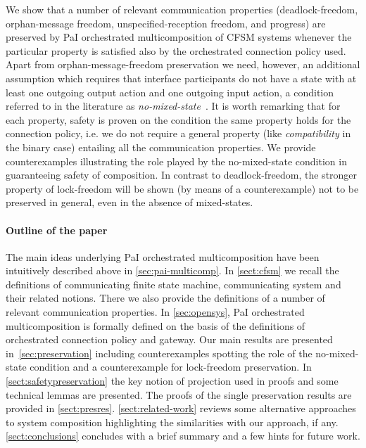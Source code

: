 We show that a number of relevant communication properties
(deadlock-freedom, orphan-message freedom, unspecified-reception freedom, and progress) are preserved by PaI orchestrated multicomposition of CFSM systems
whenever the particular property is satisfied also by the orchestrated connection policy used. 
Apart from orphan-message-freedom preservation we need, however, an additional assumption which requires that interface participants do not
have a state with at least one outgoing output action and one
outgoing input action, 
a condition referred to in the literature as {\em no-mixed-state}~\cite{CF05}.
It is worth remarking that for each property, safety is proven on the condition the same property 
holds for the connection policy, i.e. we do not require a general property 
(like {\em compatibility} in the binary case) entailing all the communication properties.  
 We provide counterexamples illustrating the role played by the no-mixed-state condition
in guaranteeing safety of composition.
 In contrast to deadlock-freedom, the stronger property of lock-freedom
will be shown (by means of a counterexample) not to be preserved in general, even in the absence of mixed-states. 


\paragraph{Outline of the paper}
 The main ideas underlying PaI orchestrated multicomposition  have been   
 intuitively described  above in \cref{sec:pai-multicomp}.
In \cref{sect:cfsm} we recall  the definitions of communicating finite state machine, communicating system and their related notions.  
There we also provide the definitions of a number of relevant communication properties. 
In \cref{sec:opensys}, PaI orchestrated multicomposition is formally defined  on the basis  of the definitions of orchestrated connection policy and gateway. 
Our main  results  are presented in~\cref{sec:preservation}
including counterexamples spotting the role of the no-mixed-state condition and a counterexample
for lock-freedom preservation. 
In \cref{sect:safetypreservation} the key notion of projection used in proofs and some technical lemmas are presented. The proofs of the single preservation results are provided in \cref{sect:presres}.
\cref{sect:related-work} reviews some alternative approaches to system composition
highlighting the similarities with our approach, if any. 
\cref{sect:conclusions} concludes with a brief summary and a few hints for future work. 


